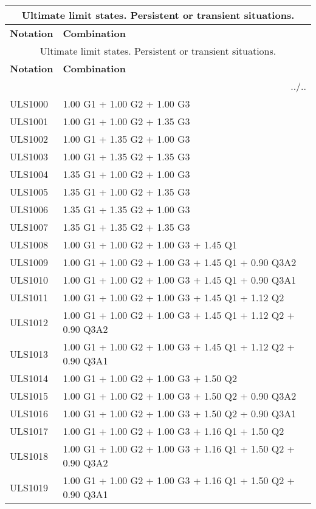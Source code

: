 \begin{center}
\begin{small}
\begin{longtable}{|l|p{10cm}|}
\hline
\multicolumn{2}{|c|}{Ultimate limit states. Persistent or transient situations.}\\
\hline
\textbf{Notation} & \textbf{Combination} \\
\hline
\endfirsthead
\hline
\multicolumn{2}{|c|}{Ultimate limit states. Persistent or transient situations.}\\
\hline
\textbf{Notation} & \textbf{Combination} \\
\hline
\endhead
\hline \multicolumn{2}{|r|}{{../..}} \\ \hline
\endfoot
\hline
\endlastfoot
ULS1000 & 1.00 G1 + 1.00 G2 + 1.00 G3\\
ULS1001 & 1.00 G1 + 1.00 G2 + 1.35 G3\\
ULS1002 & 1.00 G1 + 1.35 G2 + 1.00 G3\\
ULS1003 & 1.00 G1 + 1.35 G2 + 1.35 G3\\
ULS1004 & 1.35 G1 + 1.00 G2 + 1.00 G3\\
ULS1005 & 1.35 G1 + 1.00 G2 + 1.35 G3\\
ULS1006 & 1.35 G1 + 1.35 G2 + 1.00 G3\\
ULS1007 & 1.35 G1 + 1.35 G2 + 1.35 G3\\
ULS1008 & 1.00 G1 + 1.00 G2 + 1.00 G3 + 1.45 Q1\\
ULS1009 & 1.00 G1 + 1.00 G2 + 1.00 G3 + 1.45 Q1 + 0.90 Q3A2\\
ULS1010 & 1.00 G1 + 1.00 G2 + 1.00 G3 + 1.45 Q1 + 0.90 Q3A1\\
ULS1011 & 1.00 G1 + 1.00 G2 + 1.00 G3 + 1.45 Q1 + 1.12 Q2\\
ULS1012 & 1.00 G1 + 1.00 G2 + 1.00 G3 + 1.45 Q1 + 1.12 Q2 + 0.90 Q3A2\\
ULS1013 & 1.00 G1 + 1.00 G2 + 1.00 G3 + 1.45 Q1 + 1.12 Q2 + 0.90 Q3A1\\
ULS1014 & 1.00 G1 + 1.00 G2 + 1.00 G3 + 1.50 Q2\\
ULS1015 & 1.00 G1 + 1.00 G2 + 1.00 G3 + 1.50 Q2 + 0.90 Q3A2\\
ULS1016 & 1.00 G1 + 1.00 G2 + 1.00 G3 + 1.50 Q2 + 0.90 Q3A1\\
ULS1017 & 1.00 G1 + 1.00 G2 + 1.00 G3 + 1.16 Q1 + 1.50 Q2\\
ULS1018 & 1.00 G1 + 1.00 G2 + 1.00 G3 + 1.16 Q1 + 1.50 Q2 + 0.90 Q3A2\\
ULS1019 & 1.00 G1 + 1.00 G2 + 1.00 G3 + 1.16 Q1 + 1.50 Q2 + 0.90 Q3A1\\

\end{longtable}
\end{small}
\end{center}

